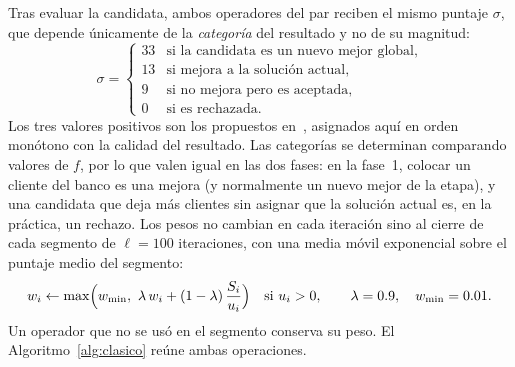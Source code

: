 Tras evaluar la candidata, ambos operadores del par reciben el mismo puntaje $\sigma$, que
depende únicamente de la \emph{categoría} del resultado y no de su magnitud:
\begin{equation}
\sigma=
\begin{cases}
33 & \text{si la candidata es un nuevo mejor global,}\\
13 & \text{si mejora a la solución actual,}\\
9  & \text{si no mejora pero es aceptada,}\\
0  & \text{si es rechazada.}
\end{cases}
\label{eq:sigma}
\end{equation}
Los tres valores positivos son los propuestos en~\cite{ropke2006}, asignados aquí en orden
monótono con la calidad del resultado. Las categorías se determinan comparando valores de
$f$, por lo que valen igual en las dos fases: en la fase~1, colocar un cliente del banco es
una mejora (y normalmente un nuevo mejor de la etapa), y una candidata que deja más clientes
sin asignar que la solución actual es, en la práctica, un rechazo. Los pesos no cambian en cada iteración sino al cierre
de cada segmento de $\ell=100$ iteraciones, con una media móvil exponencial sobre el puntaje
medio del segmento:
\begin{equation}
w_i\gets\max\Bigl(w_{\min},\ \lambda\,w_i+(1-\lambda)\,\frac{S_i}{u_i}\Bigr)\quad\text{si }u_i>0,
\qquad \lambda=0.9,\quad w_{\min}=0.01.
\label{eq:pesos}
\end{equation}
Un operador que no se usó en el segmento conserva su peso. El Algoritmo~\ref{alg:clasico}
reúne ambas operaciones.

\begin{algorithm}[H]
\caption{Selección y aprendizaje del ALNS clásico ( y )}
\label{alg:clasico}
\end{algorithm}

